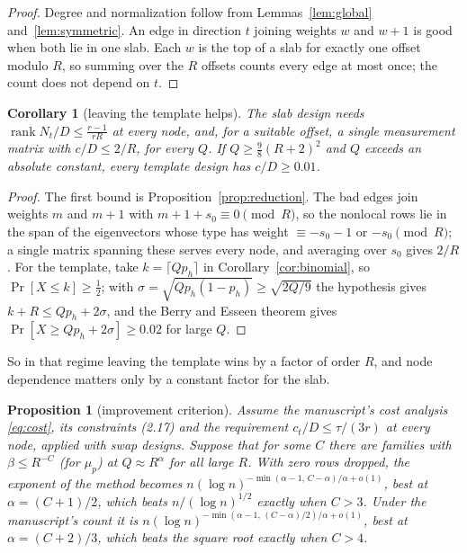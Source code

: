 \documentclass[11pt]{article}
\newtheorem{proposition}[theorem]{Proposition}
\newtheorem{corollary}[theorem]{Corollary}
\theoremstyle{definition}
\theoremstyle{remark}
\newcommand{\rank}{\operatorname{rank}}
\begin{document}
\begin{proof}
Degree and normalization follow from Lemmas~\ref{lem:global} and~\ref{lem:symmetric}. An edge in direction $t$ joining weights $w$ and $w+1$ is good when both lie in one slab. Each $w$ is the top of a slab for exactly one offset modulo $R$, so summing over the $R$ offsets counts every edge at most once; the count does not depend on $t$.
\end{proof}

\begin{corollary}[leaving the template helps]\label{cor:helps}
The slab design needs $\rank N_t/D\le\frac{r-1}{rR}$ at every node, and, for a suitable offset, a single measurement matrix with $c/D\le2/R$, for every $Q$. If $Q\ge\frac98(R+2)^2$ and $Q$ exceeds an absolute constant, every template design has $c/D\ge0.01$.
\end{corollary}

\begin{proof}
The first bound is Proposition~\ref{prop:reduction}. The bad edges join weights $m$ and $m+1$ with $m+1+s_0\equiv0\pmod R$, so the nonlocal rows lie in the span of the eigenvectors whose type has weight $\equiv-s_0-1$ or $-s_0\pmod R$; a single matrix spanning these serves every node, and averaging over $s_0$ gives $2/R$. For the template, take $k=\lceil Qp_h\rceil$ in Corollary~\ref{cor:binomial}, so $\Pr[X\le k]\ge\frac12$; with $\sigma=\sqrt{Qp_h(1-p_h)}\ge\sqrt{2Q/9}$ the hypothesis gives $k+R\le Qp_h+2\sigma$, and the Berry and Esseen theorem gives $\Pr[X\ge Qp_h+2\sigma]\ge0.02$ for large $Q$.
\end{proof}

So in that regime leaving the template wins by a factor of order $R$, and node dependence matters only by a constant factor for the slab.

\begin{proposition}[improvement criterion]\label{prop:criterion}
Assume the manuscript's cost analysis \eqref{eq:cost}, its constraints (2.17) and the requirement $c_t/D\le\tau/(3r)$ at every node, applied with swap designs. Suppose that for some $C$ there are families with $\beta\le R^{-C}$ (for $\mu_p$) at $Q\approx R^\alpha$ for all large $R$. With zero rows dropped, the exponent of the method becomes $n(\log n)^{-\min(\alpha-1,\,C-\alpha)/\alpha+o(1)}$, best at $\alpha=(C+1)/2$, which beats $n/(\log n)^{1/2}$ exactly when $C>3$. Under the manuscript's count it is $n(\log n)^{-\min(\alpha-1,\,(C-\alpha)/2)/\alpha+o(1)}$, best at $\alpha=(C+2)/3$, which beats the square root exactly when $C>4$.
\end{proposition}
\end{document}
